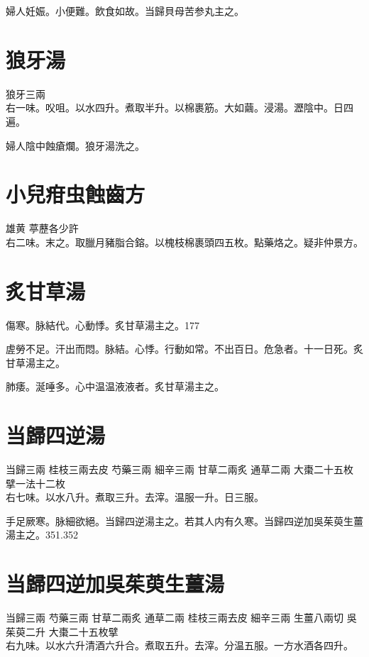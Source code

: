 {\khaaitp 婦人}妊娠。小便難。飲食如故。{\khaaitp 当}歸{\khaaitp 貝}母苦参丸主之。

\section{狼牙湯}

狼牙{\scriptsize 三兩}\\
右一味。㕮咀。以水四升。煮取半升。以棉裹筋。大如繭。浸湯。瀝陰中。日四遍。

{\khaaitp 婦人}陰中蝕瘡爛。狼牙湯洗之。

\section{小兒疳虫蝕齒方}

雄黄{ }葶藶{\scriptsize 各少許}\\
右二味。末之。取臘月豬脂合鎔。以槐枝棉裹頭四五枚。點藥烙之。{\scriptsize 疑非仲景方。}

\section{炙甘草湯}

傷寒。脉結代。心動悸。炙甘草湯主之。177

虗勞不足。汗出而悶。脉結。心悸。行動如常。不出百日。危急者。十一日死。炙甘草湯主之。

肺痿。涎唾多。心中温温液液者。炙甘草湯主之。

\section{当歸四逆湯}

当歸{\scriptsize 三兩} 桂枝{\scriptsize 三兩去皮} 芍藥{\scriptsize 三兩} 細辛{\scriptsize 三兩} 甘草{\scriptsize 二兩炙} 通草{\scriptsize 二兩} 大棗{\scriptsize 二十五枚擘一法十二枚}\\
右七味。以水八升。煮取三升。去滓。温服一升。日三服。

手足厥寒。脉細欲絕。当歸四逆湯主之。若其人内有久寒。当歸四逆加吳茱萸生薑湯主之。351.352

\section{当歸四逆加吳茱萸生薑湯}

当歸{\scriptsize 三兩} 芍藥{\scriptsize 三兩} 甘草{\scriptsize 二兩炙} 通草{\scriptsize 二兩} 桂枝{\scriptsize 三兩去皮} 細辛{\scriptsize 三兩} 生薑{\scriptsize 八兩切} 吳茱萸{\scriptsize 二升} 大棗{\scriptsize 二十五枚擘}\\
右九味。以水六升清酒六升合。煮取五升。去滓。分温五服。{\scriptsize 一方水酒各四升。}

